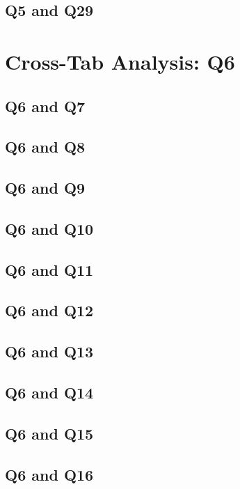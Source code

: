 \documentclass{report}
\begin{document}
\section{Q5 and Q29}\clearpage

\chapter{Cross-Tab Analysis: Q6}

\section{Q6 and Q7}\clearpage
\section{Q6 and Q8}\clearpage
\section{Q6 and Q9}\clearpage
\section{Q6 and Q10}\clearpage
\section{Q6 and Q11}\clearpage
\section{Q6 and Q12}\clearpage
\section{Q6 and Q13}\clearpage
\section{Q6 and Q14}\clearpage
\section{Q6 and Q15}\clearpage
\section{Q6 and Q16}\clearpage
\end{document}
